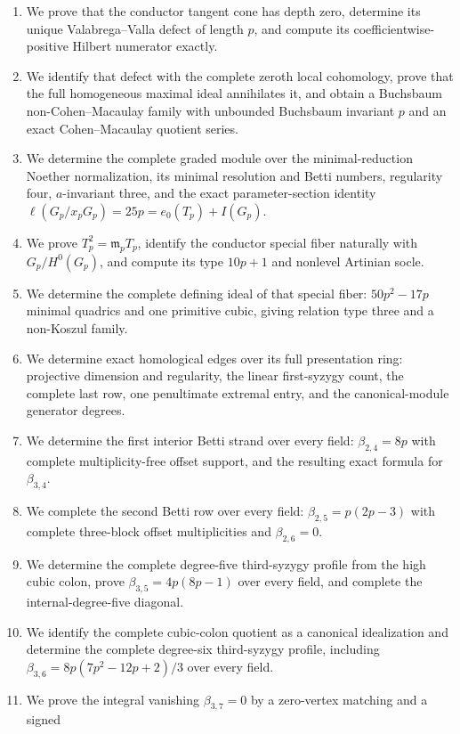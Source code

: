 \documentclass[11pt]{article}
\theoremstyle{definition}
\theoremstyle{remark}
\begin{document}
\begin{enumerate}
  Sally-quotient profile, and Hilbert--Samuel coefficients $(e_0,e_1)=(24p,39p)$.
  \item We prove that the conductor tangent cone has depth zero, determine its unique
  Valabrega--Valla defect of length $p$, and compute its coefficientwise-positive Hilbert
  numerator exactly.
  \item We identify that defect with the complete zeroth local cohomology, prove that the full
  homogeneous maximal ideal annihilates it, and obtain a Buchsbaum non-Cohen--Macaulay family with
  unbounded Buchsbaum invariant $p$ and an exact Cohen--Macaulay quotient series.
  \item We determine the complete graded module over the minimal-reduction Noether normalization,
  its minimal resolution and Betti numbers, regularity four, $a$-invariant three, and the exact
  parameter-section identity $\ell(G_p/x_pG_p)=25p=e_0(T_p)+I(G_p)$.
  \item We prove $T_p^2=\mathfrak m_pT_p$, identify the conductor special fiber naturally with
  $G_p/H^0(G_p)$, and compute its type $10p+1$ and nonlevel Artinian socle.
  \item We determine the complete defining ideal of that special fiber: $50p^2-17p$ minimal
  quadrics and one primitive cubic, giving relation type three and a non-Koszul family.
  \item We determine exact homological edges over its full presentation ring: projective
  dimension and regularity, the linear first-syzygy count, the complete last row, one penultimate
  extremal entry, and the canonical-module generator degrees.
  \item We determine the first interior Betti strand over every field: $\beta_{2,4}=8p$ with
  complete multiplicity-free offset support, and the resulting exact formula for $\beta_{3,4}$.
  \item We complete the second Betti row over every field: $\beta_{2,5}=p(2p-3)$ with complete
  three-block offset multiplicities and $\beta_{2,6}=0$.
  \item We determine the complete degree-five third-syzygy profile from the high cubic colon,
  prove $\beta_{3,5}=4p(8p-1)$ over every field, and complete the internal-degree-five diagonal.
  \item We identify the complete cubic-colon quotient as a canonical idealization and determine
  the complete degree-six third-syzygy profile, including
  $\beta_{3,6}=8p(7p^2-12p+2)/3$ over every field.
  \item We prove the integral vanishing $\beta_{3,7}=0$ by a zero-vertex matching and a signed

\end{enumerate}
\end{document}
